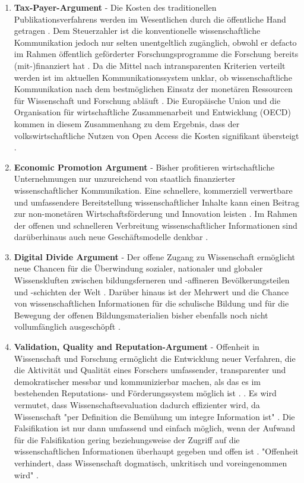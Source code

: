 \begin{enumerate}
\item \textbf{Tax-Payer-Argument} - Die Kosten des traditionellen Publikationsverfahrens werden im Wesentlichen durch die öffentliche Hand getragen \cite{muller_2010_open}. Dem Steuerzahler ist die konventionelle wissenschaftliche Kommunikation jedoch nur selten unentgeltlich zugänglich, obwohl er defacto im Rahmen öffentlich geförderter Forschungsprogramme die Forschung bereits (mit-)finanziert hat \cite{suber_2003_taxpayer} \cite{resnik_2005_ethics} \cite{Baggs_2006} \cite{Woelfle_2011} \cite{Beverungen_2012} \cite{Adema_2014_open_access}. Da die Mittel nach intransparenten Kriterien verteilt werden ist im aktuellen Kommunikationssystem unklar, ob wissenschaftliche Kommunikation nach dem bestmöglichen Einsatz der monetären Ressourcen für Wissenschaft und Forschung abläuft \cite{Glasziou_2014} \cite{altman_1994_scandal}. Die Europäische Union und die Organisation für wirtschaftliche Zusammenarbeit und Entwicklung (OECD) kommen in diesem Zusammenhang zu dem Ergebnis, dass der volkswirtschaftliche Nutzen von Open Access die Kosten signifikant übersteigt \cite{WD_bundestag_2009}.
\item \textbf{Economic Promotion Argument} - Bisher profitieren wirtschaftliche Unternehmungen nur unzureichend von staatlich finanzierter wissenschaftlicher Kommunikation. Eine schnellere, kommerziell verwertbare und umfassendere Bereitstellung wissenschaftlicher Inhalte kann einen Beitrag zur non-monetären Wirtschaftsförderung und Innovation leisten \cite{heise_2012} \cite{suchen OECD EU}. Im Rahmen der offenen und schnelleren Verbreitung wissenschaftlicher Informationen sind darüberhinaus auch neue Geschäftsmodelle denkbar \cite{suchen}.
\item \textbf{Digital Divide Argument} - Der offene Zugang zu Wissenschaft ermöglicht neue Chancen für die Überwindung sozialer, nationaler und globaler Wissenskluften \cite{suchen} zwischen bildungsferneren und -affineren Bevölkerungsteilen und -schichten der Welt \cite{boai_2012}. Darüber hinaus ist der Mehrwert und die Chance von wissenschaftlichen Informationen für die schulische Bildung und für die Bewegung der offenen Bildungsmaterialien bisher ebenfalls noch nicht vollumfänglich ausgeschöpft \cite{heise_lernen_2013}.
\item \textbf{Validation, Quality and Reputation-Argument} - Offenheit in Wissenschaft und Forschung ermöglicht die Entwicklung neuer Verfahren, die die Aktivität und Qualität eines Forschers umfassender, transparenter und demokratischer messbar und kommunizierbar machen, als das es im bestehenden Reputations- und Förderungssystem möglich ist \cite{grand_2012_open}. \cite{chalmers_2009_avoidable_waste}. Es wird vermutet, dass Wissenschaftsevaluation dadurch effizienter wird, da Wissenschaft "per Definition die Bemühung um integre Information ist" \cite{umstatter_2007_qualitatssicherung}. Die Falsifikation ist nur dann umfassend und einfach möglich, wenn der Aufwand für die Falsifikation gering beziehungsweise der Zugriff auf die wissenschaftlichen Informationen überhaupt gegeben \cite{umstatter_2007_qualitatssicherung} und offen ist \cite{Peters_2014}. "Offenheit verhindert, dass Wissenschaft dogmatisch, unkritisch und voreingenommen wird" \cite{resnik_2005_ethics}.

\end{enumerate}

